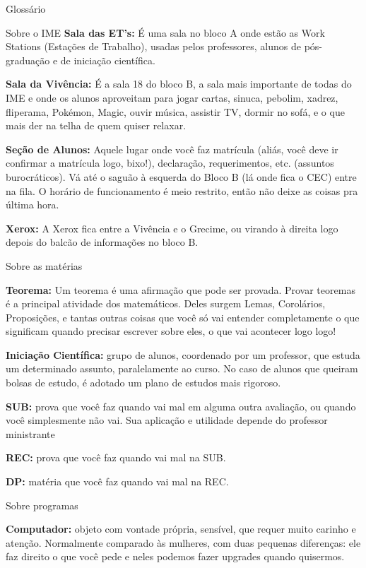 \begin{secao}{Glossário}
\begin{subsecao}{Sobre o IME}
{\bf Sala das ET's:} É uma sala no bloco A onde estão as Work
Stations (Estações de Trabalho), usadas pelos professores, alunos de
pós-graduação e de iniciação científica.

{\bf Sala da Vivência:} É a sala 18 do bloco B, a sala mais importante de todas
do IME e onde os alunos aproveitam para jogar cartas, sinuca, pebolim, xadrez,
fliperama, Pokémon, Magic, ouvir música, assistir TV, dormir no sofá, e o que
mais der na telha de quem quiser relaxar.

{\bf Seção de Alunos:} Aquele lugar onde você faz matrícula (aliás, você deve ir
confirmar a matrícula logo, bixo!), declaração, requerimentos, etc. (assuntos
burocráticos). Vá até o saguão à esquerda do Bloco B (lá onde fica o CEC) entre
na fila. O horário de funcionamento é meio restrito, então não deixe as coisas
pra última hora.

{\bf Xerox:} A Xerox fica entre a Vivência e o Grecime, ou virando à direita logo
depois do balcão de informações no bloco B.

\end{subsecao}

\begin{subsecao}{Sobre as matérias}

{\bf Teorema:} Um teorema é uma afirmação que pode ser provada. Provar
teoremas é a principal atividade dos matemáticos. Deles surgem Lemas,
Corolários, Proposições, e tantas outras coisas que você só vai entender
completamente o que significam quando precisar escrever sobre eles, o que vai
acontecer logo logo!

{\bf Iniciação Científica:} grupo de alunos, coordenado por um professor, que
estuda um determinado assunto, paralelamente ao curso. No caso de alunos que
queiram bolsas de estudo, é adotado um plano de estudos mais rigoroso.

{\bf SUB:} prova que você faz quando vai mal em alguma outra avaliação, ou
quando você simplesmente não vai. Sua aplicação e utilidade depende do
professor ministrante

{\bf REC:} prova que você faz quando vai mal na SUB.

{\bf DP:} matéria que você faz quando vai mal na REC.
\end{subsecao}

\begin{subsecao}{Sobre programas}

{\bf Computador:} objeto com vontade própria, sensível, que requer muito
carinho e atenção. Normalmente comparado às mulheres, com duas pequenas
diferenças: ele faz direito o que você pede e neles podemos fazer upgrades
quando quisermos.


\end{subsecao}
\end{secao}
